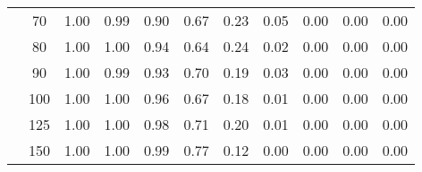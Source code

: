 \begin{table}[t]
\begin{center}
\begin{subtable}[c]{\textwidth}
\begin{center}
\begin{tabular}{rcccccccccc}
                                        & \multicolumn{1}{c|}{70}  & \num{1.00}  & \num{0.99}  & \num{0.90}  & \num{0.67}  & \num{0.23}  & \num{0.05}  & \num{0.00}  & \num{0.00}  & \num{0.00}  \\
                                        & \multicolumn{1}{c|}{80}  & \num{1.00}  & \num{1.00}  & \num{0.94}  & \num{0.64}  & \num{0.24}  & \num{0.02}  & \num{0.00}  & \num{0.00}  & \num{0.00}  \\
                                        & \multicolumn{1}{c|}{90}  & \num{1.00}  & \num{0.99}  & \num{0.93}  & \num{0.70}  & \num{0.19}  & \num{0.03}  & \num{0.00}  & \num{0.00}  & \num{0.00}  \\
                                        & \multicolumn{1}{c|}{100}  & \num{1.00}  & \num{1.00}  & \num{0.96}  & \num{0.67}  & \num{0.18}  & \num{0.01}  & \num{0.00}  & \num{0.00}  & \num{0.00}  \\
                                        & \multicolumn{1}{c|}{125}  & \num{1.00}  & \num{1.00}  & \num{0.98}  & \num{0.71}  & \num{0.20}  & \num{0.01}  & \num{0.00}  & \num{0.00}  & \num{0.00}  \\
                                        & \multicolumn{1}{c|}{150}  & \num{1.00}  & \num{1.00}  & \num{0.99}  & \num{0.77}  & \num{0.12}  & \num{0.00}  & \num{0.00}  & \num{0.00}  & \num{0.00}  \\
                                    \end{tabular}
            \end{center}
        \end{subtable}

        \vspace{5mm}


\end{center}
\end{table}
